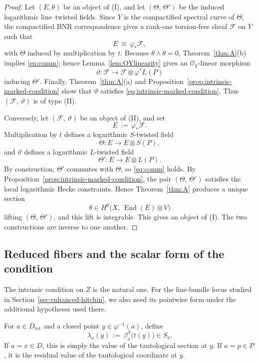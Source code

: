 \documentclass[a4paper,12pt]{amsart}
\numberwithin{equation}{section}
\theoremstyle{definition}
\newcommand{\OO}{\mathcal{O}}
\newcommand{\cF}{\mathcal{F}}
\newcommand{\End}{\operatorname{End}}
\begin{document}
\begin{proof}
Let \((E,\theta)\) be an object of \textup{(I)}, and let \((\Theta,\,\Theta')\) be the induced logarithmic line--twisted fields.  Since \(\overline{Y}\) is the compactified spectral curve of \(\Theta\), the compactified BNR correspondence gives a rank-one torsion-free sheaf \(\cF\) on \(\overline{Y}\) such that
\[
E\,\cong\, \varphi_*\cF,
\]
with \(\Theta\) induced by multiplication by \(t\).  Because \(\theta\wedge\theta=0\), Theorem~\ref{thm:A}\textup{(b)} implies \eqref{eq:comm}; hence Lemma~\ref{lem:OYlinearity} gives an \(\OO_{\overline{Y}}\)-linear morphism
\[
\vartheta:\cF\longrightarrow \cF\otimes \varphi^*L(P)
\]
inducing \(\Theta'\).  Finally, Theorem~\ref{thm:A}\textup{(a)} and Proposition~\ref{prop:intrinsic-marked-condition} show that \(\vartheta\) satisfies \eqref{eq:intrinsic-marked-condition}.  Thus \((\cF,\,\vartheta)\) is of type \textup{(II)}.

Conversely, let \((\cF,\,\vartheta)\) be an object of \textup{(II)}, and set
\[
E\,:=\,\varphi_*\cF.
\]
Multiplication by \(t\) defines a logarithmic \(S\)-twisted field
\[
\Theta:E\longrightarrow E\otimes S(P),
\]
and \(\vartheta\) defines a logarithmic \(L\)-twisted field
\[
\Theta':E\longrightarrow E\otimes L(P).
\]
By construction, \(\Theta'\) commutes with \(\Theta\), so \eqref{eq:comm} holds.  By Proposition~\ref{prop:intrinsic-marked-condition}, the pair \((\Theta,\,\Theta')\) satisfies the local logarithmic Hecke constraints.  Hence Theorem~\ref{thm:A} produces a unique section
\[
\theta\in H^0\bigl(X,\, \End(E)\otimes V\bigr)
\]
lifting \((\Theta,\,\Theta')\), and this lift is integrable.  This gives an object of \textup{(I)}.  The two constructions are inverse to one another.
\end{proof}

\subsection{Reduced fibers and the scalar form of the condition}

The intrinsic condition on \(Z\) is the natural one.  For the line-bundle locus studied in Section~\ref{sec:enhanced-hitchin}, we also need its pointwise form under the additional hypotheses used there.

For \(a\in D_{\mathrm{tot}}\) and a closed point \(y\in \varphi^{-1}(a)\), define
\[
\lambda_a(y)\,:=\,\beta_a^S\bigl(t(y)\bigr)\in S_a.
\]
If \(a=x\in D\), this is simply the value of the tautological section at \(y\).  If \(a=p\in P\), it is the residual value of the tautological coordinate at \(y\).
\end{document}
